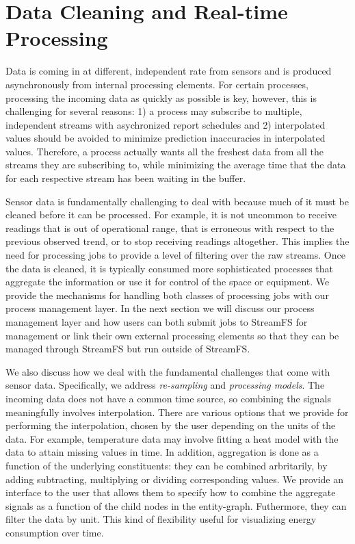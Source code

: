 \section{Data Cleaning and Real-time Processing}

Data is coming in at different, independent rate from sensors and is produced asynchronously from internal processing elements.
For certain processes, processing the incoming data as quickly as possible is key, however, this is challenging for several reasons:
1) a process may subscribe to multiple, independent streams with asychronized report schedules and 2) interpolated values
should be avoided to minimize prediction inaccuracies in interpolated values.  Therefore, a process actually wants all the freshest
data from all the streams they are subscribing to, while minimizing the average time that the data for each respective stream has 
been waiting in the buffer.

Sensor data is fundamentally challenging to deal with because much of it must be cleaned before it can be processed.  For example,
it is not uncommon to receive readings that is out of operational range, that is erroneous with respect to the previous observed trend,
or to stop receiving readings altogether.  This implies the need for processing jobs to provide a level of filtering over the raw streams.
Once the data is cleaned, it is typically consumed more sophisticated processes that aggregate the information or use it for control
of the space or equipment.  We provide the mechanisms for handling both classes of processing jobs with our process management layer.
In the next section we will discuss our process management layer and how users can both submit jobs to StreamFS for management or link
their own external processing elements so that they can be managed through StreamFS but run outside of StreamFS.

We also discuss how we deal with the fundamental challenges that come with sensor data.  Specifically, we 
address \emph{re-sampling} and \emph{processing models}.  The incoming data does not have a common
time source, so combining the signals meaningfully involves interpolation.  There are various options that we
provide for performing the interpolation, chosen by the user depending on the units of the data.  For example,
temperature data may involve fitting a heat model with the data to attain missing values in time.  In addition,
aggregation is done as a function of the underlying constituents: they can be combined arbritarily, by adding
subtracting, multiplying or dividing corresponding values.  We provide an interface to the user that
allows them to specify how to combine the aggregate signals as a function of the child nodes in the entity-graph.
Futhermore, they can filter the data by unit.  This kind of flexibility useful for visualizing
energy consumption over time.